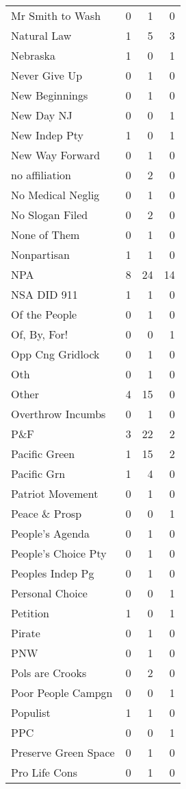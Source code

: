 \begin{supertabular}{lrrr}
Mr Smith to Wash & 0 & 1 & 0\\
Natural Law & 1 & 5 & 3\\
Nebraska & 1 & 0 & 1\\
Never Give Up & 0 & 1 & 0\\
New Beginnings & 0 & 1 & 0\\
New Day NJ & 0 & 0 & 1\\
New Indep Pty & 1 & 0 & 1\\
New Way Forward & 0 & 1 & 0\\
no  affiliation & 0 & 2 & 0\\
No Medical Neglig & 0 & 1 & 0\\
No Slogan Filed & 0 & 2 & 0\\
None of Them & 0 & 1 & 0\\
Nonpartisan & 1 & 1 & 0\\
NPA & 8 & 24 & 14\\
NSA DID 911 & 1 & 1 & 0\\
Of the People & 0 & 1 & 0\\
Of, By, For! & 0 & 0 & 1\\
Opp Cng Gridlock & 0 & 1 & 0\\
Oth & 0 & 1 & 0\\
Other & 4 & 15 & 0\\
Overthrow Incumbs & 0 & 1 & 0\\
P\&F & 3 & 22 & 2\\
Pacific Green & 1 & 15 & 2\\
Pacific Grn & 1 & 4 & 0\\
Patriot Movement & 0 & 1 & 0\\
Peace \& Prosp & 0 & 0 & 1\\
People's Agenda & 0 & 1 & 0\\
People's Choice Pty & 0 & 1 & 0\\
Peoples Indep Pg & 0 & 1 & 0\\
Personal Choice & 0 & 0 & 1\\
Petition & 1 & 0 & 1\\
Pirate & 0 & 1 & 0\\
PNW & 0 & 1 & 0\\
Pols are Crooks & 0 & 2 & 0\\
Poor People Campgn & 0 & 0 & 1\\
Populist & 1 & 1 & 0\\
PPC & 0 & 0 & 1\\
Preserve Green Space & 0 & 1 & 0\\
Pro Life Cons & 0 & 1 & 0\\

\end{supertabular}
